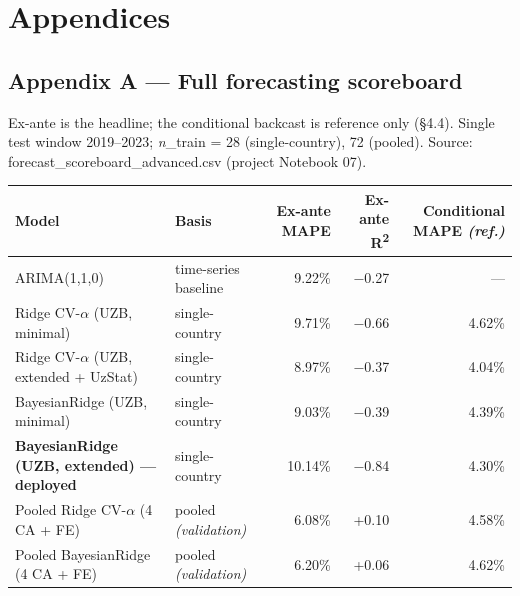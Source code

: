 \documentclass[10pt,twocolumn]{article}
\begin{document}
\section*{Appendices}

\subsection*{Appendix A --- Full forecasting scoreboard}

Ex-ante is the headline; the conditional backcast is reference only (\S{}4.4). Single test window 2019--2023; \textit{n}\_train = 28 (single-country), 72 (pooled). Source: forecast\_scoreboard\_advanced.csv (project Notebook 07).

\begin{table}[tp]
\centering
\renewcommand{\arraystretch}{1.18}\small
\begin{tabularx}{\textwidth}{LLrrr}
\toprule
\textbf{Model} & \textbf{Basis} & \textbf{Ex-ante MAPE} & \textbf{Ex-ante R\textsuperscript{2}} & \textbf{Conditional MAPE \textit{(ref.)}} \\
\midrule
ARIMA(1,1,0) & time-series baseline & 9.22\% & $-$0.27 & --- \\
Ridge CV-$\alpha$ (UZB, minimal) & single-country & 9.71\% & $-$0.66 & 4.62\% \\
Ridge CV-$\alpha$ (UZB, extended + UzStat) & single-country & 8.97\% & $-$0.37 & 4.04\% \\
BayesianRidge (UZB, minimal) & single-country & 9.03\% & $-$0.39 & 4.39\% \\
\textbf{BayesianRidge (UZB, extended) --- deployed} & single-country & 10.14\% & $-$0.84 & 4.30\% \\
Pooled Ridge CV-$\alpha$ (4 CA + FE) & pooled \textit{(validation)} & 6.08\% & +0.10 & 4.58\% \\
Pooled BayesianRidge (4 CA + FE) & pooled \textit{(validation)} & 6.20\% & +0.06 & 4.62\% \\
\bottomrule
\end{tabularx}
\par{}
\end{table}
\end{document}
